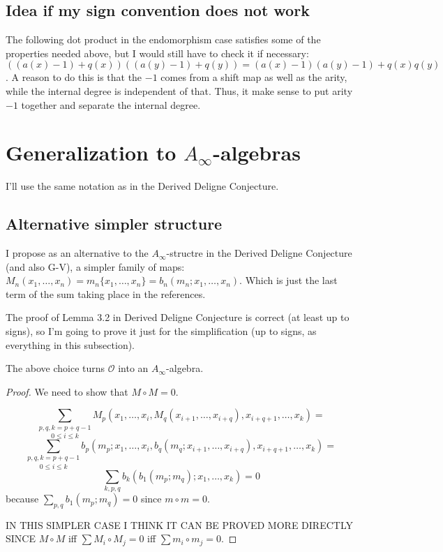 \documentclass[twoside]{article}
\begin{document}
\subsection{Idea if my sign convention does not work}

The following dot product in the endomorphism case satisfies some of the properties needed above, but I would still have to check it if necessary: $((a(x)-1)+q(x))((a(y)-1)+q(y))=(a(x)-1)(a(y)-1)+q(x)q(y)$. A reason to do this is that the $-1$ comes from a shift map as well as the arity, while the internal degree is independent of that. Thus, it make sense to put arity $-1$ together and separate the internal degree.

\section{Generalization to $A_\infty$-algebras}
I'll use the same notation as in the Derived Deligne Conjecture.

\subsection{Alternative simpler structure}
I propose as an alternative to the $A_\infty$-structre in the Derived Deligne Conjecture (and also G-V), a simpler family of maps: $M_n(x_1,\dots, x_n)=m_n\{x_1,\dots, x_n\}=b_n(m_n;x_1,\dots, x_n)$. Which is just the last term of the sum taking place in the references.

The proof of Lemma 3.2 in Derived Deligne Conjecture is correct (at least up to signs), so I'm going to prove it just for the simplification (up to signs, as everything in this subsection).

\begin{lemma} The above choice turns $\mathcal{O}$ into an $A_\infty$-algebra.
\end{lemma}
\begin{proof}
We need to show that $M\circ M=0$. 

\[
\underset{0\leq i\leq k}{\sum_{p,q,k=p+q-1}}M_p(x_1,\dots, x_i, M_q(x_{i+1},\dots, x_{i+q}),x_{i+q+1},\dots, x_k)=
\]
\[
\underset{0\leq i\leq k}{\sum_{p,q,k=p+q-1}}b_p(m_p; x_1,\dots, x_i, b_q(m_q;x_{i+1},\dots, x_{i+q}),x_{i+q+1},\dots, x_k)=
\]
\[
\sum_{k,p,q}b_k(b_1(m_p;m_q);x_1,\dots, x_k)=0
\]
because $\sum_{p,q}b_1(m_p;m_q)=0$ since $m\circ m=0$.

IN THIS SIMPLER CASE I THINK IT CAN BE PROVED MORE DIRECTLY SINCE $M\circ M$ iff $\sum M_i\circ M_j=0$ iff $\sum m_i\circ m_j=0$. 
\end{proof}
\end{document}
